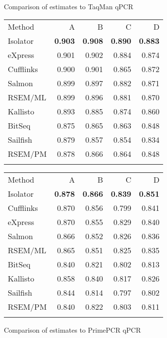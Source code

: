 \documentclass[twocolumn]{article}
\begin{document}
\begin{figure*}
\begin{subtable}{0.5\linewidth}
\caption{Comparison of estimates to TaqMan qPCR}
\begin{tabular}[c]{@{}lrrrr@{}}
\toprule\addlinespace
Method & A & B & C & D
\\\addlinespace
\midrule
Isolator & \textbf{0.903} & \textbf{0.908} & \textbf{0.890} &
\textbf{0.883}
\\\addlinespace
eXpress & 0.901 & 0.902 & 0.884 & 0.874
\\\addlinespace
Cufflinks & 0.900 & 0.901 & 0.865 & 0.872
\\\addlinespace
Salmon & 0.899 & 0.897 & 0.882 & 0.871
\\\addlinespace
RSEM/ML & 0.899 & 0.896 & 0.881 & 0.870
\\\addlinespace
Kallisto & 0.893 & 0.885 & 0.874 & 0.860
\\\addlinespace
BitSeq & 0.875 & 0.865 & 0.863 & 0.848
\\\addlinespace
Sailfish & 0.879 & 0.857 & 0.854 & 0.834
\\\addlinespace
RSEM/PM & 0.878 & 0.866 & 0.864 & 0.848
\\\addlinespace
\bottomrule
\addlinespace
\end{tabular}
\label{table:taqman}
\end{subtable}
\begin{subtable}{0.5\linewidth}
\caption{Comparison of estimates to PrimePCR qPCR}
\begin{tabular}[c]{@{}lrrrr@{}}
\toprule\addlinespace
Method & A & B & C & D
\\\addlinespace
\midrule
Isolator & \textbf{0.878} & \textbf{0.866} & \textbf{0.839} &
\textbf{0.851}
\\\addlinespace
Cufflinks & 0.870 & 0.856 & 0.799 & 0.841
\\\addlinespace
eXpress & 0.870 & 0.855 & 0.829 & 0.840
\\\addlinespace
Salmon & 0.866 & 0.852 & 0.826 & 0.836
\\\addlinespace
RSEM/ML & 0.865 & 0.851 & 0.825 & 0.835
\\\addlinespace
BitSeq & 0.840 & 0.821 & 0.802 & 0.813
\\\addlinespace
Kallisto & 0.858 & 0.840 & 0.817 & 0.826
\\\addlinespace
Sailfish & 0.844 & 0.814 & 0.797 & 0.802
\\\addlinespace
RSEM/PM & 0.840 & 0.822 & 0.803 & 0.811
\\\addlinespace
\bottomrule
\addlinespace
\end{tabular}
\label{table:primepcr}
\end{subtable}


\end{figure*}
\end{document}
